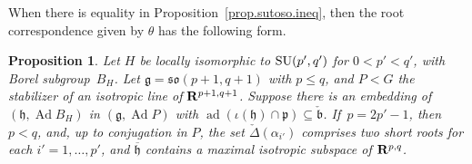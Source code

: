\documentclass[10pt,a4paper]{amsart}
\numberwithin{equation}{section}
\newtheorem{prop}[thm]{Proposition}
\theoremstyle{definition}
\newcommand{\BR}{{\bf R}}
\newcommand{\lieg}{\mathfrak{g}}
\newcommand{\lieh}{\mathfrak{h}}
\def\p{{\mathfrak p}}
\def\b{{\mathfrak b}}
\newcommand{\so}{\mathfrak{so}}
\newcommand{\SU}{{\rm SU}}
\begin{document}
When there is equality in Proposition~\ref{prop.sutoso.ineq}, then the root correspondence given by $\theta$ has the following form.

\begin{prop}
\label{prop.sutoso.roots}
Let $H$ be locally isomorphic to $\SU(p',q')$ for $0 < p' < q'$, with Borel subgroup~$B_H$. Let $\lieg = \so(p+1,q+1)$ with $p \leq q$, and $P < G$ the stabilizer of an isotropic line of $\BR^{p+1,q+1}$. Suppose there is an embedding of $(\lieh, \operatorname{Ad} B_H)$ in $(\lieg, \operatorname{Ad}P)$ with $\operatorname{ad}(\iota(\lieh) \cap \p ) \subseteq \check{\b}$.
If~${p=2p'-1}$, then $p<q$, and, up to conjugation in $P$, the set $\check{\Delta}(\alpha_{i'})$ comprises two short roots for each $i'=1, \dots, p'$, and $\overline{\lieh}$ contains a maximal isotropic subspace of $\BR^{p,q}$.
\end{prop}
\end{document}
